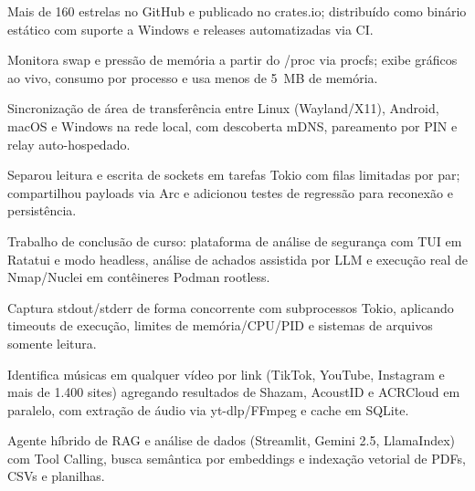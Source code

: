\begin{cvbullets}
  \item Mais de 160 estrelas no GitHub e publicado no crates.io; distribuído como binário estático com suporte a Windows e releases automatizadas via CI.
  \item Monitora swap e pressão de memória a partir do /proc via procfs; exibe gráficos ao vivo, consumo por processo e usa menos de 5~MB de memória.
\end{cvbullets}

\begin{cvbullets}
  \item Sincronização de área de transferência entre Linux (Wayland/X11), Android, macOS e Windows na rede local, com descoberta mDNS, pareamento por PIN e relay auto-hospedado.
  \item Separou leitura e escrita de sockets em tarefas Tokio com filas limitadas por par; compartilhou payloads via Arc e adicionou testes de regressão para reconexão e persistência.
\end{cvbullets}

\begin{cvbullets}
  \item Trabalho de conclusão de curso: plataforma de análise de segurança com TUI em Ratatui e modo headless, análise de achados assistida por LLM e execução real de Nmap/Nuclei em contêineres Podman rootless.
  \item Captura stdout/stderr de forma concorrente com subprocessos Tokio, aplicando timeouts de execução, limites de memória/CPU/PID e sistemas de arquivos somente leitura.
\end{cvbullets}

\begin{cvbullets}
  \item Identifica músicas em qualquer vídeo por link (TikTok, YouTube, Instagram e mais de 1.400 sites) agregando resultados de Shazam, AcoustID e ACRCloud em paralelo, com extração de áudio via yt-dlp/FFmpeg e cache em SQLite.
\end{cvbullets}

\begin{cvbullets}
  \item Agente híbrido de RAG e análise de dados (Streamlit, Gemini 2.5, LlamaIndex) com Tool Calling, busca semântica por embeddings e indexação vetorial de PDFs, CSVs e planilhas.
\end{cvbullets}

